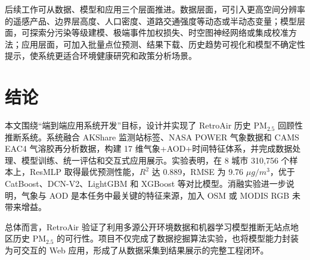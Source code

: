 \documentclass[UTF8,zihao=-4,a4paper]{ctexart}
\newcommand{\pmfine}{PM$_{2.5}$}
\newcommand{\aod}{AOD}
\begin{document}
后续工作可从数据、模型和应用三个层面推进。数据层面，可引入更高空间分辨率的遥感产品、边界层高度、人口密度、道路交通强度等动态或半动态变量；模型层面，可探索分污染等级建模、极端事件加权损失、时空图神经网络或集成校准方法；应用层面，可加入批量点位预测、结果下载、历史趋势可视化和模型不确定性提示，使系统更适合环境健康研究和政策分析场景。

\section{结论}

本文围绕“端到端应用系统开发”目标，设计并实现了 RetroAir 历史 \pmfine{} 回顾性推断系统。系统融合 AKShare 监测站标签、NASA POWER 气象数据和 CAMS EAC4 气溶胶再分析数据，构建 17 维气象+\aod{}+时间特征体系，并完成数据处理、模型训练、统一评估和交互式应用展示。实验表明，在 8 城市 310,756 个样本上，ResMLP 取得最优预测性能，$R^2$ 达 0.889，RMSE 为 9.76 $\mu g/m^3$，优于 CatBoost、DCN-V2、LightGBM 和 XGBoost 等对比模型。消融实验进一步说明，气象与 \aod{} 是本任务中最关键的特征来源，加入 OSM 或 MODIS RGB 未带来增益。

总体而言，RetroAir 验证了利用多源公开环境数据和机器学习模型推断无站点地区历史 \pmfine{} 的可行性。项目不仅完成了数据挖掘算法实验，也将模型能力封装为可交互的 Web 应用，形成了从数据采集到结果展示的完整工程闭环。
\end{document}
